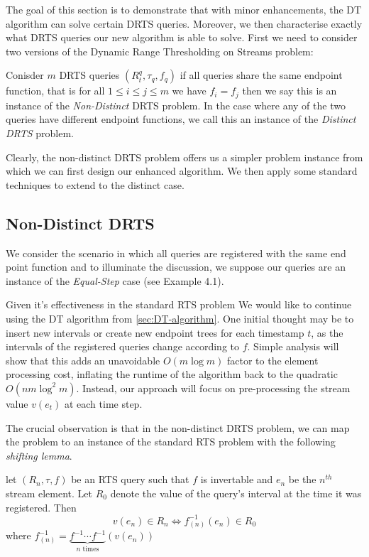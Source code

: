The goal of this section is to demonstrate that with minor enhancements, the DT algorithm can solve certain DRTS queries. Moreover, we then characterise exactly what DRTS queries our new algorithm is able to solve. First we need to consider two versions of the Dynamic Range Thresholding on Streams problem: 

\begin{definition}
    Conisder $m$ DRTS queries $(R_{t}^q, \tau_q, f_q)$ if all queries share the same endpoint function, that is for all $1\leq i\leq  j\leq m$ we have $f_i = f_j$ then we say this is an instance of the \textit{Non-Distinct} DRTS problem. In the case where any of the two queries have different endpoint functions, we call this an instance of the \textit{Distinct DRTS} problem.
\end{definition}

Clearly, the non-distinct DRTS problem offers us a simpler problem instance from which we can first design our enhanced algorithm. We then apply some standard techniques to extend to the distinct case. 

\subsection{Non-Distinct DRTS}
\label{ssec:non-distinct-rts}

We consider the scenario in which all queries are registered with the same end point function and to illuminate the discussion, we suppose our queries are an instance of the \textit{Equal-Step} case (see Example 4.1). 

Given it's effectiveness in the standard RTS problem We would like to continue using the DT algorithm from \cref{sec:DT-algorithm}. One initial thought may be to insert new intervals or create new endpoint trees for each timestamp $t$, as the intervals of the registered queries change according to $f$. Simple analysis will show that this adds an unavoidable $O(m\log m)$ factor to the element processing cost, inflating the runtime of the algorithm back to the quadratic $O(nm\log^2 m)$. Instead, our approach will focus on pre-processing the stream value $v(e_t)$ at each time step. 

The crucial observation is that in the non-distinct DRTS problem, we can map the problem to an instance of the standard RTS problem with the following \textit{shifting lemma}. 

\begin{lemma}
    let $(R_n, \tau, f)$ be an RTS query such that $f$ is invertable and $e_n$ be the $n^{th}$ stream element. Let $R_0$ denote the value of the query's interval at the time it was registered. Then 
    $$v(e_n) \in R_n \iff f^{-1}_{(n)}(e_n)\in R_0$$
    where $f^{-1}_{(n)} = \underbrace{f^{-1}\cdots f^{-1}}_{n \text{ times}}(v(e_n))$
\end{lemma}


